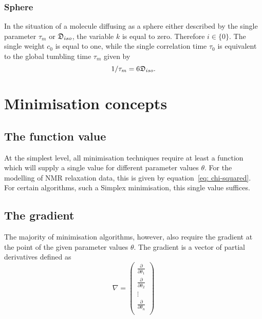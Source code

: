 \subsubsection{Sphere}
In the situation of a molecule diffusing as a sphere either described by the single parameter $\tau_m$ or $\mathfrak{D}_{iso}$, the variable $k$ is equal to zero.  Therefore $i \in \{0\}$.  The single weight $c_0$ is equal to one, while the single correlation time $\tau_0$ is equivalent to the global tumbling time $\tau_m$ given by
\begin{equation} \label{eq: sphere tau0}
 1/\tau_m = 6\mathfrak{D}_{iso}.
\end{equation}







\section{Minimisation concepts}

\subsection{The function value}

At the simplest level, all minimisation techniques require at least a function which will supply a single value for different parameter values $\theta$.  For the modelling of NMR relaxation data, this is given by equation~\eqref{eq: chi-squared}.  For certain algorithms, such a Simplex minimisation, this single value suffices.


\subsection{The gradient}

The majority of minimisation algorithms, however, also require the gradient at the point of the given parameter values $\theta$.  The gradient is a vector of partial derivatives defined as
\begin{equation}
 \nabla = \begin{pmatrix}
  \frac{\partial}{\partial \theta_1} \\
  \frac{\partial}{\partial \theta_2} \\
  \vdots \\
  \frac{\partial}{\partial \theta_n} \\
 \end{pmatrix}
\end{equation}

